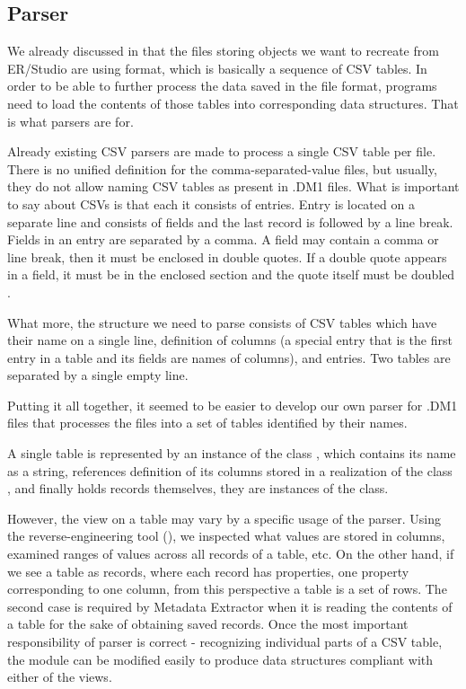 \subsection{Parser}
\label{subsec:dm1_parser}

We already discussed in  that the files storing objects we want to recreate from ER/Studio are using format, which is basically a sequence of CSV tables. 
In order to be able to further process the data saved in the file format, programs need to load the contents of those tables into corresponding data structures. That is what parsers are for.

Already existing CSV parsers are made to process a single CSV table per file. There is no unified definition for the comma-separated-value files, but usually, they do not allow naming CSV tables as present in .DM1 files.
What is important to say about CSVs is that each it consists of entries. 
Entry is located on a separate line and consists of fields and the last record is followed by a line break. 
Fields in an entry are separated by a comma.
A field may contain a comma or line break, then it must be enclosed in double quotes.
If a double quote appears in a field, it must be in the enclosed section and the quote itself must be doubled \cite{RfcCSV}.

What more, the structure we need to parse consists of CSV tables which have their name on a single line, definition of columns (a special entry that is the first entry in a table and its fields are names of columns), and entries. 
Two tables are separated by a single empty line.

Putting it all together, it seemed to be easier to develop our own parser for .DM1 files that processes the files into a set of tables identified by their names.

A single table is represented by an instance of the class , which contains its name as a string, references definition of its columns stored in a realization of the class , and finally holds records themselves, they are instances of the  class.

However, the view on a table may vary by a specific usage of the parser. 
Using the reverse-engineering tool (), we inspected what values are stored in columns, examined ranges of values across all records of a table, etc.
On the other hand, if we see a table as records, where each record has properties, one property corresponding to one column, from this perspective a table is a set of rows.
The second case is required by Metadata Extractor when it is reading the contents of a table for the sake of obtaining saved records. 
Once the most important responsibility of parser is correct - recognizing individual parts of a CSV table, the module can be modified easily to produce data structures compliant with either of the views.

